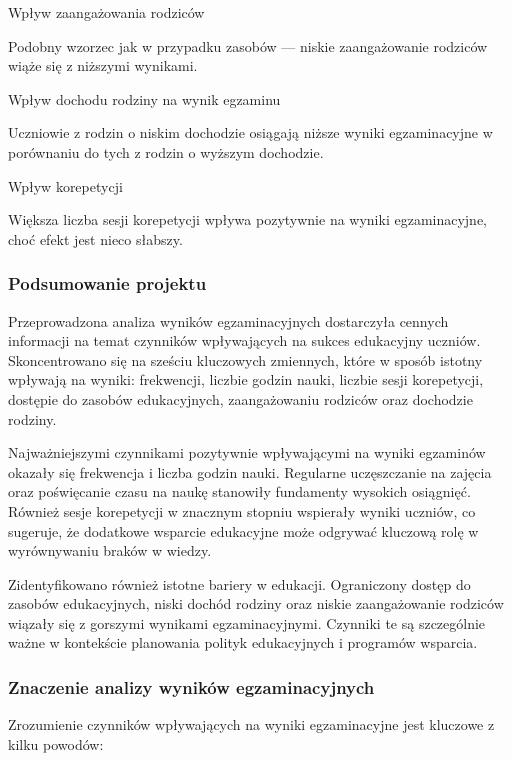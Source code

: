 \documentclass[
]{article}
\begin{document}
Wpływ zaangażowania rodziców

Podobny wzorzec jak w przypadku zasobów --- niskie zaangażowanie
rodziców wiąże się z niższymi wynikami.

Wpływ dochodu rodziny na wynik egzaminu

Uczniowie z rodzin o niskim dochodzie osiągają niższe wyniki
egzaminacyjne w porównaniu do tych z rodzin o wyższym dochodzie.

Wpływ korepetycji

Większa liczba sesji korepetycji wpływa pozytywnie na wyniki
egzaminacyjne, choć efekt jest nieco słabszy.

\subsubsection{Podsumowanie projektu}\label{podsumowanie-projektu}

Przeprowadzona analiza wyników egzaminacyjnych dostarczyła cennych
informacji na temat czynników wpływających na sukces edukacyjny uczniów.
Skoncentrowano się na sześciu kluczowych zmiennych, które w sposób
istotny wpływają na wyniki: frekwencji, liczbie godzin nauki, liczbie
sesji korepetycji, dostępie do zasobów edukacyjnych, zaangażowaniu
rodziców oraz dochodzie rodziny.

Najważniejszymi czynnikami pozytywnie wpływającymi na wyniki egzaminów
okazały się frekwencja i liczba godzin nauki. Regularne uczęszczanie na
zajęcia oraz poświęcanie czasu na naukę stanowiły fundamenty wysokich
osiągnięć. Również sesje korepetycji w znacznym stopniu wspierały wyniki
uczniów, co sugeruje, że dodatkowe wsparcie edukacyjne może odgrywać
kluczową rolę w wyrównywaniu braków w wiedzy.

Zidentyfikowano również istotne bariery w edukacji. Ograniczony dostęp
do zasobów edukacyjnych, niski dochód rodziny oraz niskie zaangażowanie
rodziców wiązały się z gorszymi wynikami egzaminacyjnymi. Czynniki te są
szczególnie ważne w kontekście planowania polityk edukacyjnych i
programów wsparcia.

\subsubsection{Znaczenie analizy wyników
egzaminacyjnych}\label{znaczenie-analizy-wynikuxf3w-egzaminacyjnych}

Zrozumienie czynników wpływających na wyniki egzaminacyjne jest kluczowe
z kilku powodów:
\end{document}
